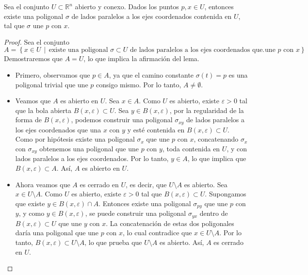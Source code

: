\begin{lema}
    Sea el conjunto \( U \subset \mathbb{R}^n \) abierto y conexo. Dados los puntos \( p, x \in U \), entonces existe una poligonal \( \sigma \) de lados paralelos a los ejes coordenados contenida en \( U \), tal que \( \sigma \) une \( p \) con \( x \).
    \label{lema:poligonal}
\end{lema}

\begin{proof}
    Sea el conjunto
    \[
    A = \left\{ x \in U \,\middle|\, \text{existe una poligonal } \sigma \subset U \text{ de lados paralelos a los ejes coordenados que une } p \text{ con } x \right\}.
    \]
    Demostraremos que \( A = U \), lo que implica la afirmación del lema.

    \begin{itemize}
        \item Primero, observamos que \( p \in A \), ya que el camino constante \( \sigma(t) = p \) es una poligonal trivial que une \( p \) consigo mismo. Por lo tanto, \( A \neq \emptyset \).
        
        \item Veamos que \( A \) es abierto en \( U \). Sea \( x \in A \). Como \( U \) es abierto, existe \( \varepsilon > 0 \) tal que la bola abierta \( B(x, \varepsilon) \subset U \). Sea \( y \in B(x, \varepsilon) \), por la regularidad de la forma de \(B(x, \varepsilon)\), podemos construir una poligonal \( \sigma_{xy} \) de lados paralelos a los ejes coordenados que una \( x \) con \( y \) y esté contenida en \( B(x, \varepsilon) \subset U \). Como por hipótesis existe una poligonal \( \sigma_{x} \) que une \( p \) con \( x \), concatenando \( \sigma_{x} \) con \( \sigma_{xy} \) obtenemos una poligonal que une \( p \) con \( y \), toda contenida en \( U \), y con lados paralelos a los ejes coordenados. Por lo tanto, \( y \in A \), lo que implica que \( B(x, \varepsilon) \subset A \). Así, \( A \) es abierto en \( U \).

        \item Ahora veamos que \( A \) es cerrado en \( U \), es decir, que \( U \setminus A \) es abierto. Sea \( x \in U \setminus A \). Como \( U \) es abierto, existe \( \varepsilon > 0 \) tal que \( B(x, \varepsilon) \subset U \). Supongamos que existe \( y \in B(x, \varepsilon) \cap A \). Entonces existe una poligonal \( \sigma_{py} \) que une \( p \) con \( y \), y como \( y \in B(x, \varepsilon) \), se puede construir una poligonal \( \sigma_{yx} \) dentro de \( B(x, \varepsilon) \subset U \) que une \( y \) con \( x \). La concatenación de estas dos poligonales daría una poligonal que une \( p \) con \( x \), lo cual contradice que \( x \in U \setminus A \). Por lo tanto, \( B(x, \varepsilon) \subset U \setminus A \), lo que prueba que \( U \setminus A \) es abierto. Así, \( A \) es cerrado en \( U \).
    \end{itemize}


\end{proof}
